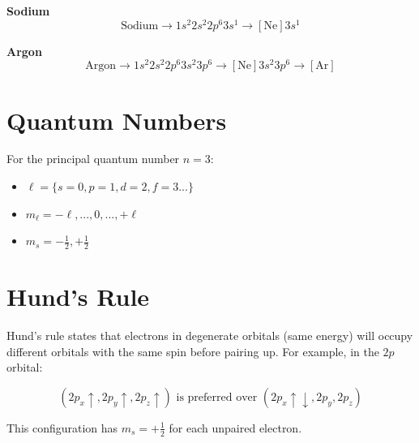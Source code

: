 \documentclass{report}
\begin{document}
\textbf{Sodium}
\[ \text{Sodium} \rightarrow 1s^2 2s^2 2p^6 3s^1 \rightarrow [\text{Ne}] 3s^1 \]

\textbf{Argon}
\[ \text{Argon} \rightarrow 1s^2 2s^2 2p^6 3s^2 3p^6 \rightarrow [\text{Ne}] 3s^2 3p^6 \rightarrow [\text{Ar}] \]

\section{Quantum Numbers}

For the principal quantum number $n = 3$:

\begin{itemize}
	\item $\ell = \{s=0, p=1, d=2, f=3...\}$
	\item $m_\ell = -\ell, ..., 0, ..., +\ell$
	\item $m_s = -\frac{1}{2}, +\frac{1}{2}$
\end{itemize}

\section{Hund's Rule}

Hund's rule states that electrons in degenerate orbitals (same energy) will occupy different orbitals with the same spin before pairing up. For example, in the $2p$ orbital:

\[ (2p_x \uparrow, 2p_y \uparrow, 2p_z \uparrow) \text{ is preferred over } (2p_x \uparrow\downarrow, 2p_y, 2p_z) \]

This configuration has $m_s = +\frac{1}{2}$ for each unpaired electron.
\end{document}
